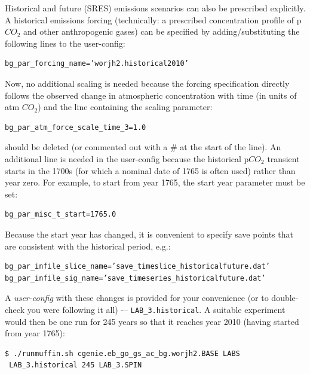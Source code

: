 \documentclass[11pt,fleqn]{book} %
\begin{document}
Historical and future (SRES) emissions scenarios can also be prescribed explicitly. A historical emissions forcing (technically: a prescribed concentration profile of p\(CO_{2}\) and other anthropogenic gases) can be specified by adding/substituting the following lines to the user-config: 
\vspace{-2pt}\begin{verbatim}
bg_par_forcing_name=’worjh2.historical2010’
\end{verbatim}\vspace{-2pt}
Now, no additional scaling is needed because the forcing specification directly follows the observed change in atmospheric concentration with time (in units of atm \(CO_{2}\)) and the line containing the scaling parameter: 
\vspace{-2pt}\begin{verbatim}
bg_par_atm_force_scale_time_3=1.0
\end{verbatim}\vspace{-2pt}
should be deleted (or commented out with a \# at the start of the line).
An additional line is needed in the user-config because the historical p\(CO_{2}\) transient starts in the 1700s (for which a nominal date of 1765 is often used) rather than year zero. For example, to start from year 1765, the start year parameter must be set:
\vspace{-2pt}\begin{verbatim}
bg_par_misc_t_start=1765.0
\end{verbatim}\vspace{-2pt}
Because the start year has changed, it is convenient to specify save points that are consistent with the historical period, e.g.:
\vspace{-2pt}\begin{verbatim}
bg_par_infile_slice_name=’save_timeslice_historicalfuture.dat’
bg_par_infile_sig_name=’save_timeseries_historicalfuture.dat’
\end{verbatim}\vspace{-2pt}

A \textit{user-config} with these changes is provided for your convenience (or to double-check you were following it all) -– \texttt{LAB\_3.historical}. A suitable experiment would then be one run for 245 years so that it reaches year 2010 (having started from year 1765): 
\vspace{-2pt}\begin{verbatim}
$ ./runmuffin.sh cgenie.eb_go_gs_ac_bg.worjh2.BASE LABS
 LAB_3.historical 245 LAB_3.SPIN
\end{verbatim}\vspace{-2pt}
\end{document}
